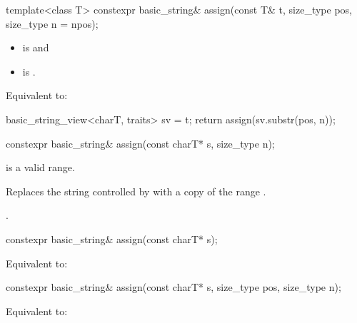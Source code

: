 %
\begin{itemdecl}
template<class T>
  constexpr basic_string& assign(const T& t, size_type pos, size_type n = npos);
\end{itemdecl}

\begin{itemdescr}
\pnum
\constraints
\begin{itemize}
\item
{} is
 and
\item
{} is
.
\end{itemize}

\pnum
\effects
Equivalent to:
\begin{codeblock}
basic_string_view<charT, traits> sv = t;
return assign(sv.substr(pos, n));
\end{codeblock}
\end{itemdescr}

%
\begin{itemdecl}
constexpr basic_string& assign(const charT* s, size_type n);
\end{itemdecl}

\begin{itemdescr}
\pnum
\expects
{} is a valid range.

\pnum
\effects
Replaces the string controlled by  with
a copy of the range .

\pnum
\returns
{}.
\end{itemdescr}

%
\begin{itemdecl}
constexpr basic_string& assign(const charT* s);
\end{itemdecl}

\begin{itemdescr}
\pnum
\effects
Equivalent to: 
\end{itemdescr}

%
\begin{itemdecl}
constexpr basic_string& assign(const charT* s, size_type pos, size_type n);
\end{itemdecl}

\begin{itemdescr}
\pnum
\effects
Equivalent to:
\end{itemdescr}

